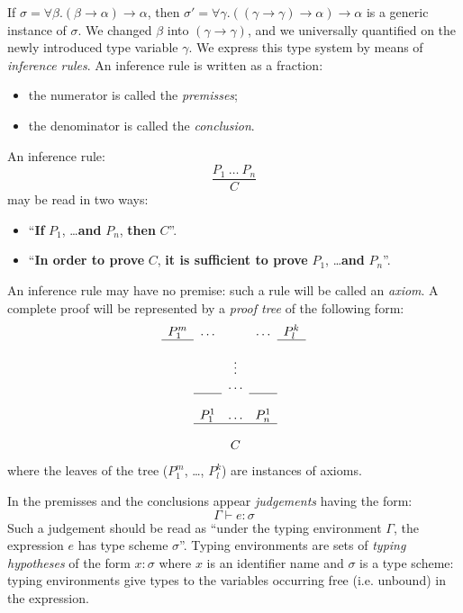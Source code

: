 \Example
If $\sigma = \forall \beta . (\beta \rightarrow \alpha) \rightarrow \alpha$,
then $\sigma' = \forall \gamma . ((\gamma \rightarrow \gamma)
                                      \rightarrow \alpha) \rightarrow \alpha$
is a generic instance of $\sigma$. We changed
$\beta$ into $(\gamma \rightarrow \gamma)$, and we universally quantified
on the newly introduced type variable $\gamma$.
\End
%
We express this type system by means of {\em inference rules}. An
inference rule is written as a fraction:
\begin{itemize}
\item the numerator is called the {\em premisses};
\item the denominator is called the {\em conclusion}.
\end{itemize}
An inference rule:
\[\frac{P_1~\ldots~P_n}{C}\]
may be read in two ways:
\begin{itemize}
\item ``{\bf If} $P_1$, \ldots {\bf and} $P_n$, {\bf then} $C$''.
\item ``{\bf In order to prove} $C$, {\bf it is sufficient to prove} $P_1$, \ldots {\bf and} $P_n$''.
\end{itemize}
An inference rule may have no premise: such a rule will be called an
{\em axiom}. A complete proof will be represented by a {\em proof tree}
of the following form:
\[
\begin{array}{ccccc}
 P_1^m       &   \ldots    &              & \ldots       & P_l^k\\
 \cline{1-1}                                               \cline{5-5}\\
             &             & \vdots       &              & \\
             &             & \ldots       &              &\\
               \cline{2-2}                  \cline{4-4}  & \\
             &   P_1^1     &  \ldots      & P_n^1        &\\
                              \cline{2-4}                 \\
             &             &     C        &              &
\end{array}
\]
where the leaves of the tree ($P_1^m$, \ldots, $P_l^k$) are instances of axioms.

In the premisses and the conclusions appear {\em judgements} having the form:
\[
\Gamma \vdash e:\sigma
\]
Such a judgement should be read as ``under the typing environment
$\Gamma$, the expression $e$ has type scheme $\sigma$''. Typing
environments are sets of {\em typing hypotheses} of the form $x:\sigma$
where $x$ is an identifier name and $\sigma$ is a type scheme: typing
environments give types to the variables occurring free (i.e. unbound)
in the expression.

